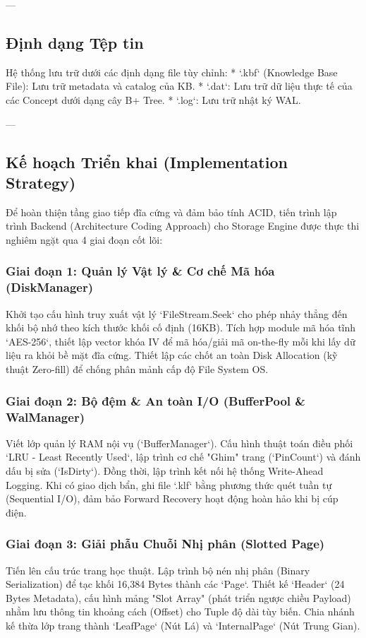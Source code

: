 ---

\subsection{Định dạng Tệp tin}

Hệ thống lưu trữ dưới các định dạng file tùy chỉnh:
*   `.kbf` (Knowledge Base File): Lưu trữ metadata và catalog của KB.
*   `.dat`: Lưu trữ dữ liệu thực tế của các Concept dưới dạng cây B+ Tree.
*   `.log`: Lưu trữ nhật ký WAL.

---

\subsection{Kế hoạch Triển khai (Implementation Strategy)}

Để hoàn thiện tầng giao tiếp đĩa cứng và đảm bảo tính ACID, tiến trình lập trình Backend (Architecture Coding Approach) cho Storage Engine được thực thi nghiêm ngặt qua 4 giai đoạn cốt lõi:

\subsubsection{Giai đoạn 1: Quản lý Vật lý & Cơ chế Mã hóa (DiskManager)}
Khởi tạo cấu hình truy xuất vật lý `FileStream.Seek` cho phép nhảy thẳng đến khối bộ nhớ theo kích thước khối cố định (16KB). Tích hợp module mã hóa tĩnh `AES-256`, thiết lập vector khóa IV để mã hóa/giải mã on-the-fly mỗi khi lấy dữ liệu ra khỏi bề mặt đĩa cứng. Thiết lập các chốt an toàn Disk Allocation (kỹ thuật Zero-fill) để chống phân mảnh cấp độ File System OS.

\subsubsection{Giai đoạn 2: Bộ đệm & An toàn I/O (BufferPool & WalManager)}
Viết lớp quản lý RAM nội vụ (`BufferManager`). Cấu hình thuật toán điều phối `LRU - Least Recently Used`, lập trình cơ chế "Ghim" trang (`PinCount`) và đánh dấu bị sửa (`IsDirty`). Đồng thời, lập trình kết nối hệ thống Write-Ahead Logging. Khi có giao dịch bẩn, ghi file `.klf` bằng phương thức quét tuần tự (Sequential I/O), đảm bảo Forward Recovery hoạt động hoàn hảo khi bị cúp điện. 

\subsubsection{Giai đoạn 3: Giải phẫu Chuỗi Nhị phân (Slotted Page)}
Tiến lên cấu trúc trang học thuật. Lập trình bộ nén nhị phân (Binary Serialization) để tạc khối 16,384 Bytes thành các `Page`. Thiết kế `Header` (24 Bytes Metadata), cấu hình mảng "Slot Array" (phát triển ngược chiều Payload) nhằm lưu thông tin khoảng cách (Offset) cho Tuple độ dài tùy biến. Chia nhánh kế thừa lớp trang thành `LeafPage` (Nút Lá) và `InternalPage` (Nút Trung Gian).

